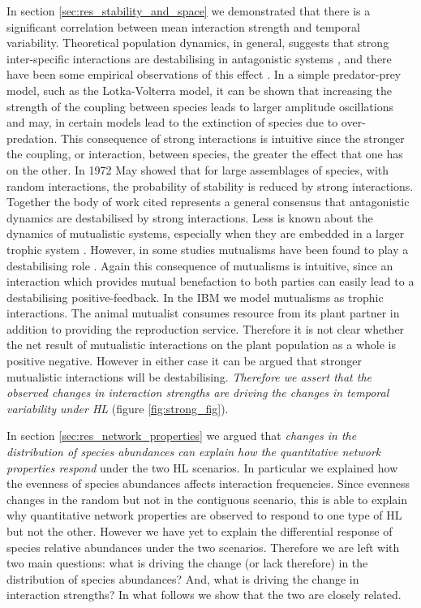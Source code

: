 In section \ref{sec:res_stability_and_space} we demonstrated that there is a significant correlation between mean interaction strength and temporal variability. Theoretical population dynamics, in general, suggests that strong inter-specific interactions are destabilising in antagonistic systems \cite{may1972will,mccann1998weak,neutel2002stability,kokkoris1999patterns,coyte2015ecology}, and there have been some empirical observations of this effect \cite{o2009perturbations}. In a simple predator-prey model, such as the Lotka-Volterra model, it can be shown that increasing the strength of the coupling between species leads to larger amplitude oscillations and may, in certain models lead to the extinction of species due to over-predation. This consequence of strong interactions is intuitive since the stronger the coupling, or interaction, between species, the greater the effect that one has on the other. In 1972 May showed \cite{may1972will} that for large assemblages of species, with random interactions, the probability of stability is reduced by strong interactions. Together the body of work cited represents a general consensus that antagonistic dynamics are destabilised by strong interactions. Less is known about the dynamics of mutualistic systems, especially when they are embedded in a larger trophic system \cite{lurgi2015effects,sauve2014structure}. However, in some studies mutualisms have been found to play a destabilising role \cite{coyte2015ecology,may1981patterns}. Again this consequence of mutualisms is intuitive, since an interaction which provides mutual benefaction to both parties can easily lead to a destabilising positive-feedback. In the IBM we model mutualisms as trophic interactions. The animal mutualist consumes resource from its plant partner in addition to providing the reproduction service. Therefore it is not clear whether the net result of mutualistic interactions on the plant population as a whole is positive  negative. However in either case it can be argued that stronger mutualistic interactions will be destabilising. \emph{Therefore we assert that the observed changes in interaction strengths are driving the changes in temporal variability under HL} (figure \ref{fig:strong_fig}). 

In section \ref{sec:res_network_properties} we argued that \emph{changes in the distribution of species abundances can explain how the quantitative network properties respond} under the two HL scenarios. In particular we explained how the evenness of species abundances affects interaction frequencies. Since evenness changes in the random but not in the contiguous scenario, this is able to explain why quantitative network properties are observed to respond to one type of HL but not the other. However we have yet to explain the differential response of species relative abundances under the two scenarios. Therefore we are left with two main questions: what is driving the change (or lack therefore) in the distribution of species abundances? And, what is driving the change in interaction strengths? In what follows we show that the two are closely related.  

